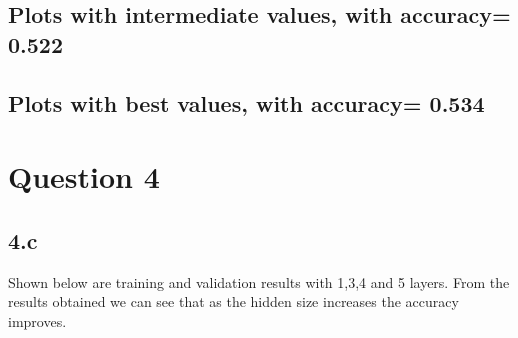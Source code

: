 \documentclass{article}
\begin{document}
\subsection*{Plots with intermediate values, with accuracy= 0.522}

\begin{figure}[!h]
	\begin{center}
		\hspace{2mm}
	
		
		
	\end{center}
	\captionsetup{justification=raggedright,margin=1cm}
	\label{gr}
\end{figure}
\newpage

\subsection*{Plots with best values, with accuracy= 0.534}

\begin{figure}[!h]
	\begin{center}
		\hspace{2mm}
	
		
		
	\end{center}
	\captionsetup{justification=raggedright,margin=1cm}
	\label{gr}
\end{figure}


\section*{Question 4}
\subsection*{4.c}
Shown below are training and validation results with 1,3,4 and 5 layers.
From the results obtained we can see that as the hidden size increases the accuracy improves.
\end{document}
